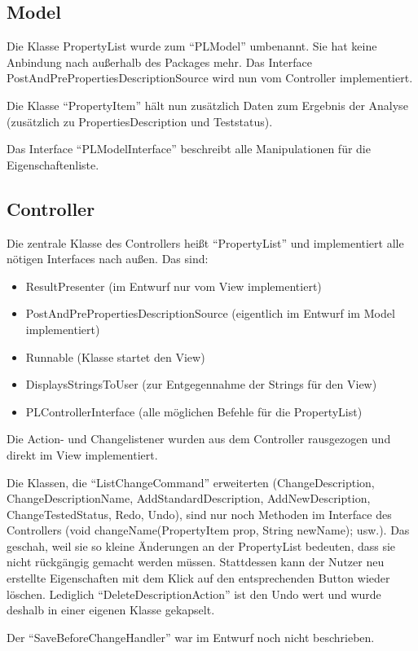 \documentclass[a4paper]{scrreprt}
\begin{document}
\subsection{Model}
Die Klasse PropertyList wurde zum "`PLModel"' umbenannt. Sie hat keine Anbindung nach außerhalb des Packages mehr. Das Interface PostAndPrePropertiesDescriptionSource wird nun vom Controller implementiert.

Die Klasse "`PropertyItem"' hält nun zusätzlich Daten zum Ergebnis der Analyse (zusätzlich zu PropertiesDescription und Teststatus).

Das Interface "`PLModelInterface"' beschreibt alle Manipulationen für die Eigenschaftenliste.

\subsection{Controller}
Die zentrale Klasse des Controllers heißt "`PropertyList"' und implementiert alle nötigen Interfaces nach außen. Das sind:
\begin{itemize}
	\item ResultPresenter (im Entwurf nur vom View implementiert)
	\item PostAndPrePropertiesDescriptionSource (eigentlich im Entwurf im Model implementiert)
	\item Runnable (Klasse startet den View)
	\item DisplaysStringsToUser (zur Entgegennahme der Strings für den View)
	\item PLControllerInterface (alle möglichen Befehle für die PropertyList)
\end{itemize}
Die Action- und Changelistener wurden aus dem Controller rausgezogen und direkt im View implementiert.

Die Klassen, die "`ListChangeCommand"' erweiterten (ChangeDescription, ChangeDescriptionName, AddStandardDescription, AddNewDescription, ChangeTestedStatus, Redo, Undo), sind nur noch Methoden im Interface des Controllers (void changeName(PropertyItem prop, String newName); usw.). Das geschah, weil sie so kleine Änderungen an der PropertyList bedeuten, dass sie nicht rückgängig gemacht werden müssen. Stattdessen kann der Nutzer neu erstellte Eigenschaften mit dem Klick auf den entsprechenden Button wieder löschen. Lediglich "`DeleteDescriptionAction"' ist den Undo wert und wurde deshalb in einer eigenen Klasse gekapselt.

Der "`SaveBeforeChangeHandler"' war im Entwurf noch nicht beschrieben.
\end{document}
